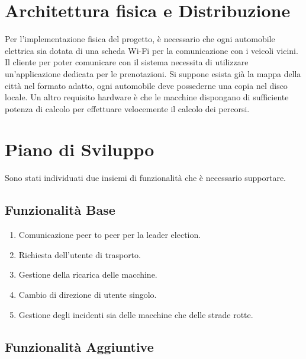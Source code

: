 \section{Architettura fisica e Distribuzione}
Per l'implementazione fisica del progetto, è necessario che ogni automobile elettrica sia dotata di una scheda Wi-Fi per la comunicazione con i veicoli vicini. Il cliente per poter comunicare con il sistema necessita di utilizzare un'applicazione dedicata per le prenotazioni. Si suppone esista già la mappa della città nel formato adatto, ogni automobile deve possederne una copia nel disco locale. Un altro requisito hardware è che le macchine dispongano di sufficiente potenza di calcolo per effettuare velocemente il calcolo dei percorsi.


\section{Piano di Sviluppo}

Sono stati individuati due insiemi di funzionalità che è necessario supportare.
\subsection{Funzionalità Base}

\begin{enumerate}
	\item Comunicazione peer to peer per la leader election.
	\item Richiesta dell'utente di trasporto.
	\item Gestione della ricarica delle macchine.
	\item Cambio di direzione di utente singolo.
	\item Gestione degli incidenti sia delle macchine che delle strade rotte.
\end{enumerate}

\subsection{Funzionalità Aggiuntive}


